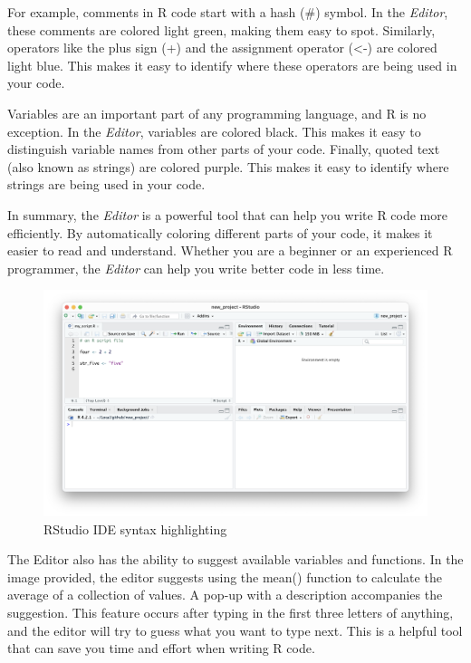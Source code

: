 \documentclass[
]{book}
\begin{document}
For example, comments in R code start with a hash (\#) symbol. In the \emph{Editor}, these comments are colored light green, making them easy to spot. Similarly, operators like the plus sign (+) and the assignment operator (\textless-) are colored light blue. This makes it easy to identify where these operators are being used in your code.

Variables are an important part of any programming language, and R is no exception. In the \emph{Editor}, variables are colored black. This makes it easy to distinguish variable names from other parts of your code. Finally, quoted text (also known as strings) are colored purple. This makes it easy to identify where strings are being used in your code.

In summary, the \emph{Editor} is a powerful tool that can help you write R code more efficiently. By automatically coloring different parts of your code, it makes it easier to read and understand. Whether you are a beginner or an experienced R programmer, the \emph{Editor} can help you write better code in less time.

\begin{figure}
\includegraphics[width=31.94in]{images/02_022_editor_highlighting} \caption{\label{fig:2022}RStudio IDE syntax highlighting}\label{fig:2022}
\end{figure}

The Editor also has the ability to suggest available variables and functions. In the image provided, the editor suggests using the mean() function to calculate the average of a collection of values. A pop-up with a description accompanies the suggestion. This feature occurs after typing in the first three letters of anything, and the editor will try to guess what you want to type next. This is a helpful tool that can save you time and effort when writing R code.
\end{document}
